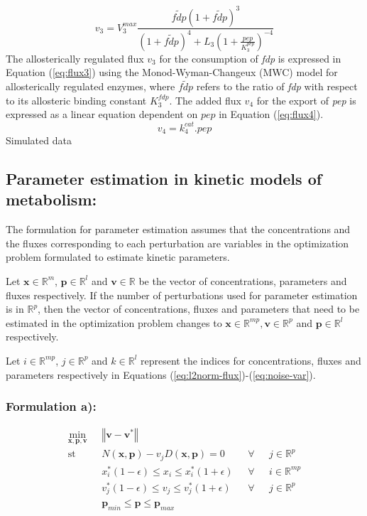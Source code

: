 \documentclass[10pt]{report}
\begin{document}
	\begin{equation}\label{eq:flux3}
	v_3 = V_{3}^{max}\frac{\tilde{fdp}\left(1+\tilde{fdp}\right)^3}{\left(1+\tilde{fdp}\right)^4+L_3\left(1+\frac{pep}{K_{3}^{pep}}\right)^{-4}}
	\end{equation}
	The allosterically regulated flux $v_3$ for the consumption of \textit{fdp} is expressed in Equation (\ref{eq:flux3}) using the Monod-Wyman-Changeux (MWC) model for allosterically regulated enzymes, where $\tilde{fdp}$ refers to the ratio of \textit{fdp} with respect to its allosteric binding constant $K_{3}^{fdp}$. The added flux $v_4$ for the export of \textit{pep} is expressed as a linear equation dependent on $pep$ in Equation (\ref{eq:flux4}).
	\begin{equation}\label{eq:flux4}
	v_4 = k_{4}^{cat}.pep
	\end{equation}
	Simulated data 
	
	\subsection{Parameter estimation in kinetic models of metabolism:}
	The formulation for parameter estimation assumes that the concentrations and the fluxes corresponding to each perturbation are variables in the optimization problem formulated to estimate kinetic parameters.
	
	Let $\mathbf{x}\in\mathbb{R}^m$, $\mathbf{p}\in\mathbb{R}^l$ and $\mathbf{v}\in\mathbb{R}$ be the vector of concentrations, parameters and fluxes respectively. If the number of perturbations used for parameter estimation is in $\mathbb{R}^p$, then the vector of concentrations, fluxes and parameters that need to be estimated in the optimization problem changes to $\mathbf{x}\in\mathbb{R}^{mp}, \mathbf{v}\in\mathbb{R}^{p}$ and $\mathbf{p}\in\mathbb{R}^{l}$ respectively. 
	
	Let $i\in\mathbb{R}^{mp}$, $j\in\mathbb{R}^{p}$ and $k\in\mathbb{R}^{l}$ represent the indices for concentrations, fluxes and parameters respectively in Equations (\ref{eq:l2norm-flux})-(\ref{eq:noise-var}).
	
	\subsubsection{Formulation a):}		
	\begin{subequations}\label{eq:l2norm-flux}
		\begin{align}
		\underset{\mathbf{x},\mathbf{p},\mathbf{v}}{\mathrm{min}} & \text{      }\left\Vert \mathbf{v}-\mathbf{v}^*\right\Vert\\
		\mathrm{st}& \text{      }N(\mathbf{x},\mathbf{p}) - v_jD(\mathbf{x},\mathbf{p}) = 0 & \text{  }\forall & \text{ }j\in\mathbb{R}^p\\
		& \text{      }x^*_i(1-\epsilon)\le x_i \le x^*_i(1+\epsilon) & \text{  }\forall & \text{ }i\in\mathbb{R}^{mp}\\	
		& \text{      }v^*_j(1-\epsilon)\le v_j \le v^*_j(1+\epsilon) & \text{  }\forall & \text{ }j\in\mathbb{R}^{p}\\		
		& \text{      }\mathbf{p}_{min} \le \mathbf{p} \le \mathbf{p}_{max}
		\end{align}
	\end{subequations}
\end{document}
